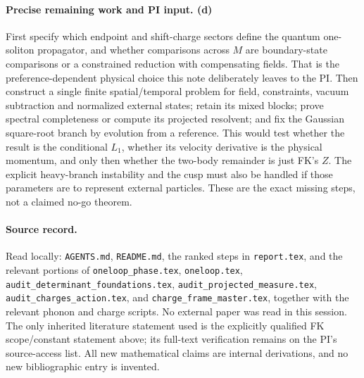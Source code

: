 \documentclass[11pt,a4paper]{article}
\newcommand{\Ld}{\textbf{(d)}}
\begin{document}
\paragraph{Precise remaining work and PI input. \Ld}
First specify which endpoint and shift-charge sectors define the quantum
one-soliton propagator, and whether comparisons across $M$ are boundary-state
comparisons or a constrained reduction with compensating fields. That is the
preference-dependent physical choice this note deliberately leaves to the PI.
Then construct a single finite spatial/temporal problem for field, constraints,
vacuum subtraction and normalized external states; retain its mixed blocks;
prove spectral completeness or compute its projected resolvent; and fix the
Gaussian square-root branch by evolution from a reference. This would test
whether the result is the conditional $L_1$, whether its velocity derivative
is the physical momentum, and only then whether the two-body remainder is
just FK's $Z$. The explicit heavy-branch instability and the cusp must also
be handled if those parameters are to represent external particles.
These are the exact missing steps, not a claimed no-go theorem.

\paragraph{Source record.}
Read locally: \texttt{AGENTS.md}, \texttt{README.md}, the ranked steps in
\texttt{report.tex}, and the relevant portions of
\texttt{oneloop\_phase.tex}, \texttt{oneloop.tex},
\texttt{audit\_determinant\_foundations.tex},
\texttt{audit\_projected\_measure.tex},
\texttt{audit\_charges\_action.tex}, and \texttt{charge\_frame\_master.tex},
together with the relevant phonon and charge scripts. No external paper
was read in this session. The only inherited literature statement used is
the explicitly qualified FK scope/constant statement above; its full-text
verification remains on the PI's source-access list. All new mathematical
claims are internal derivations, and no new bibliographic entry is invented.
\end{document}
